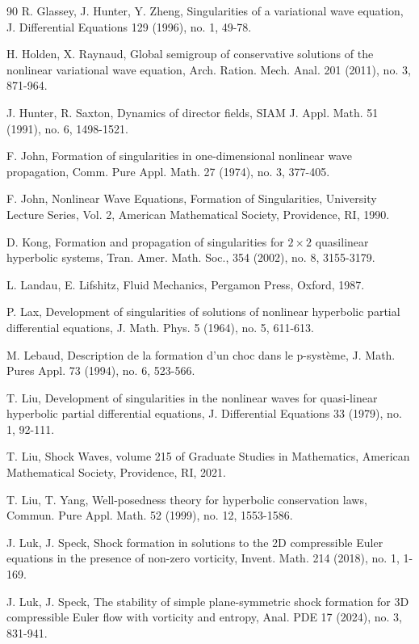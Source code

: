 \documentclass[11pt,reqno]{article}
\numberwithin{equation}{section}
\begin{document}
\begin{thebibliography}{90}
 R. Glassey, J. Hunter, Y. Zheng, Singularities of a variational wave equation, J. Differential Equations 129 (1996), no. 1, 49-78.

 H. Holden, X. Raynaud, Global semigroup of conservative solutions of the nonlinear variational wave equation, Arch. Ration. Mech. Anal. 201 (2011), no. 3, 871-964.

 J. Hunter, R. Saxton, Dynamics of director fields, SIAM J. Appl. Math. 51 (1991), no. 6, 1498-1521.

 F. John, Formation of singularities in one-dimensional nonlinear wave propagation, Comm. Pure Appl. Math. 27 (1974), no. 3, 377-405.

 F. John, Nonlinear Wave Equations, Formation of Singularities, University Lecture Series, Vol. 2, American Mathematical Society, Providence, RI, 1990.

 D. Kong, Formation and propagation of singularities for $2\times2$ quasilinear hyperbolic systems, Tran. Amer. Math. Soc., 354 (2002), no. 8, 3155-3179.

 L. Landau, E. Lifshitz, Fluid Mechanics, Pergamon Press, Oxford, 1987.

 P. Lax, Development of singularities of solutions of nonlinear hyperbolic partial differential equations, J. Math. Phys. 5 (1964), no. 5, 611-613.

 M. Lebaud, Description de la formation d'un choc dans le p-syst\`{e}me, J. Math. Pures Appl. 73 (1994), no. 6, 523-566.

 T. Liu, Development of singularities in the nonlinear waves for quasi-linear hyperbolic partial differential equations, J. Differential Equations 33 (1979), no. 1, 92-111.

 T. Liu,  Shock Waves, volume 215 of Graduate Studies in Mathematics, American Mathematical Society, Providence, RI, 2021.

  T. Liu, T. Yang,  Well-posedness theory for hyperbolic conservation laws, Commun. Pure Appl. Math.  52 (1999), no. 12, 1553-1586.

 J. Luk, J. Speck, Shock formation in solutions to the 2D compressible Euler equations in the presence of non-zero vorticity, Invent. Math. 214 (2018), no. 1, 1-169.

 J. Luk, J. Speck, The stability of simple plane-symmetric shock formation for 3D compressible Euler flow with vorticity and entropy, Anal. PDE 17 (2024), no. 3, 831-941.


\end{thebibliography}
\end{document}
